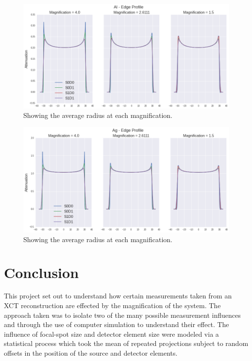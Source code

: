 \documentclass[
  twoside,
  11pt, a4paper,
  footinclude=true,
  headinclude=true,
  cleardoublepage=empty
]{scrbook}
\begin{document}
\begin{figure}[h!]
  \centering
    \includegraphics[width=\textwidth]{figures/polyal.png}
    \caption{Showing the average radius at each magnification.}
    \label{polyal}
\end{figure}

\begin{figure}[h!]
  \centering
    \includegraphics[width=\textwidth]{figures/polyag.png}
    \caption{Showing the average radius at each magnification.}
    \label{polyag}
\end{figure}


\chapter{Conclusion}

This project set out to understand how certain measurements taken from an XCT reconstruction are effected by the magnification of the system. The approach taken was to isolate two of the many possible measurement influences and through the use of computer simulation to understand their effect. The influence of focal-spot size and detector element size were modeled via a statistical process which took the mean of repeated projections subject to random offsets in the position of the source and detector elements.
\end{document}
